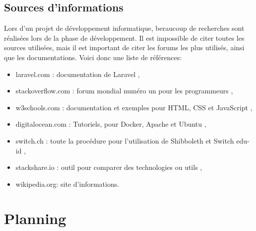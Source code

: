 \documentclass[
    iai, %
    il, %
]{heig-tb}
\begin{document}

\section{Sources d'informations}
Lors d'un projet de développement informatique, beraucoup de recherches sont réalisées lors de la
phase de développement. Il est impossible de citer toutes les sources utilisées, mais il est
important de citer les forums les plus utilisés, ainsi que les documentations.\newline
Voici donc une liste de références:

\begin{itemize}
    \item laravel.com : documentation de Laravel \cite{laravel},
    \item stackoverflow.com : forum mondial numéro un pour les programmeurs \cite{stackoverflow},
    \item w3schools.com : documentation et exemples pour HTML, CSS et JavaScript \cite{w3schools},
    \item digitalocean.com : Tutoriels, pour Docker, Apache et Ubuntu \cite{digitalocean},
    \item switch.ch : toute la procédure pour l’utilisation de Shibboleth et Switch edu-id \cite{switch},
    \item stackshare.io : outil pour comparer des technologies ou utils \cite{stackshare},
    \item wikipedia.org: site d'informations.
\end{itemize}

\vfil
\hspace{8cm}\makeatletter\@author\makeatother\par
\hspace{8cm}\begin{minipage}{5cm}
    \printsignature
\end{minipage}
\clearpage

\appendix
\appendixpage
\addappheadtotoc

\chapter{Planning}

\begin{landscape}
    
\end{landscape}
\end{document}
